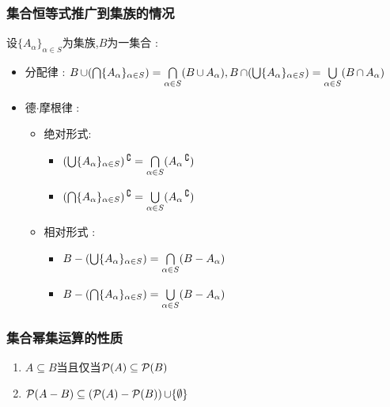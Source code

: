 {{\subsubsection{集合恒等式推广到集族的情况}{
设$\{A_\alpha\}_{\alpha \in S}$为集族,$B$为一集合 :

\begin{itemize}
  \item 分配律 : $B \unionSet (\updownIntersection{~}{~}\{A_\alpha\}_{\alpha \in S}) = \updownIntersection{~}{\alpha \in S}(B \unionSet A_\alpha),B \intersectionSet (\updownUnion{~}{~}\{A_\alpha\}_{\alpha \in S}) = \updownUnion{~}{\alpha \in S}(B \intersectionSet A_\alpha)$
  \item 德$\cdot$摩根律 : \begin{itemize}
          \item 绝对形式: \begin{itemize}
                  \item $(\updownUnion{~}{~}\{A_\alpha\}_{\alpha \in S})\absoluteCompletementSet = \updownIntersection{~}{\alpha \in S}(A_\alpha\absoluteCompletementSet)$
                  \item$(\updownIntersection{~}{~}\{A_\alpha\}_{\alpha \in S})\absoluteCompletementSet = \updownUnion{~}{\alpha \in S}(A_\alpha\absoluteCompletementSet)$
                \end{itemize}
          \item 相对形式 : \begin{itemize}
                  \item $B - (\updownUnion{~}{~}\{A_\alpha\}_{\alpha \in S}) = \updownIntersection{~}{\alpha \in S}(B - A_\alpha)$
                  \item $B - (\updownIntersection{~}{~}\{A_\alpha\}_{\alpha \in S}) = \updownUnion{~}{\alpha \in S}(B - A_\alpha)$
                \end{itemize}
        \end{itemize}
\end{itemize}
}%

\subsubsection{集合幂集运算的性质}{
  \begin{enumerate}
    \item $A \subseteq B$当且仅当$\powerSetOf{A} \subseteq \powerSetOf{B}$
    \item $\powerSetOf{A - B} \subseteq (\powerSetOf{A} - \powerSetOf{B}) \unionSet \{\emptyset\}$
  \end{enumerate}
}%

}}
